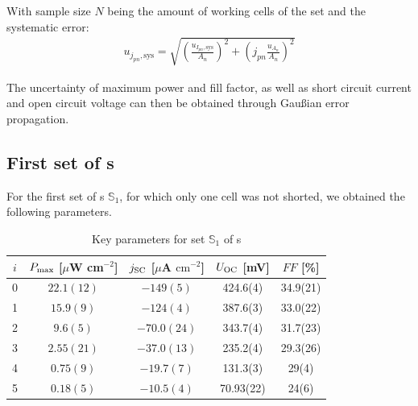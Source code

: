 With sample size $N$ being the amount of working cells of the set and the systematic error:
\begin{align}
u_{j_{pn},\text{sys}} = \sqrt{ \left( \frac{ u_{I_{pn},\text{sys}}}{A_n}\right)^2+\left( j_{pn}\frac{u_{A_n}}{A_n} \right)^2}
\end{align}

The uncertainty of maximum power and fill factor, as well as short circuit current and open circuit voltage can then be obtained through Gaußian error propagation.

\subsection{First set of \BHSC s}\label{subsec:S1data}

For the first set of \BHSC s $\mathbb{S}_1$, for which only one cell was not shorted, we obtained the following parameters.

\begin{table}[h]\centering
\caption{Key parameters for set $\mathbb{S}_1$ of \BHSC s}
\label{tab:keyparams1}
\begin{tabular}{@{}ccccc@{}}\toprule
$i$ & $P_{\text{max}}$ [$\mu$W cm$^{-2}$] & $j_{\text{SC}}$ [$\mu$A $\mathrm{cm}^{-2}$] & $U_{\text{OC}}$ [mV] & $FF$ [\%]\\\midrule
0 &  $ 22.1(12) $ & $ -149(5) $ & 424.6(4) & 34.9(21) \\
1 &  $ 15.9(9) $ & $ -124(4) $ & 387.6(3) & 33.0(22) \\
2 &  $ 9.6(5) $ & $ -70.0(24) $ & 343.7(4) & 31.7(23) \\
3 &  $ 2.55(21) $ & $ -37.0(13) $ & 235.2(4) & 29.3(26) \\
4 &  $ 0.75(9) $ & $ -19.7(7) $ & 131.3(3) & 29(4)\\
5 &  $ 0.18(5) $ & $ -10.5(4) $ & 70.93(22) & 24(6) \\\midrule

\end{tabular}
\end{table}


